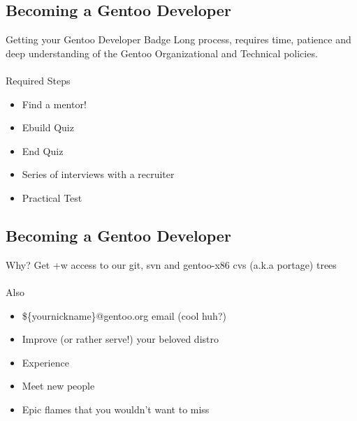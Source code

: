 \subsection{Becoming a Gentoo Developer}
\begin{frame}{Getting your Gentoo Developer Badge}
Long process, requires time, patience and deep understanding of the Gentoo Organizational and Technical policies.
\\~\\
Required Steps
	\begin{itemize}
		\item Find a mentor!
		\item Ebuild Quiz
		\item End Quiz
		\item Series of interviews with a recruiter
		\item Practical Test
	\end{itemize}
\end{frame}

\subsection{Becoming a Gentoo Developer}
\begin{frame}{Why?}
Get +w access to our git, svn and gentoo-x86 cvs (a.k.a portage) trees
\\~\\
Also
	\begin{itemize}
		\item \$\{yournickname\}@gentoo.org email (cool huh?)
		\item Improve (or rather serve!) your beloved distro
		\item Experience
		\item Meet new people
		\item Epic flames that you wouldn't want to miss
	\end{itemize}
\end{frame}

